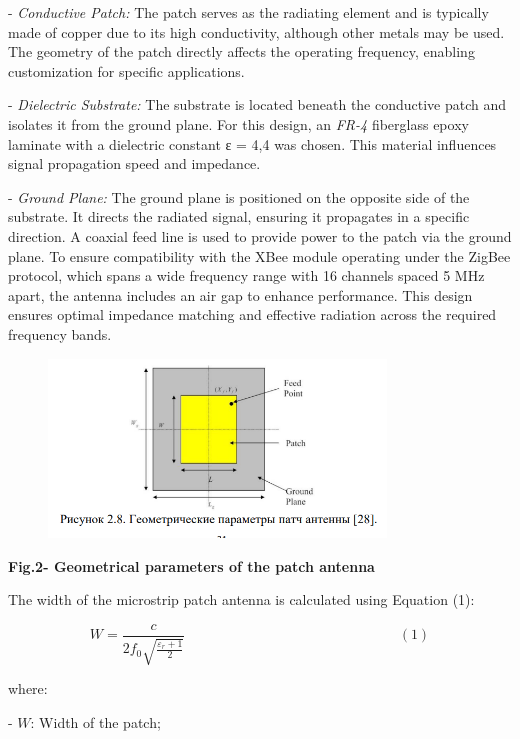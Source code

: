 - \emph{Conductive Patch:} The patch serves as the radiating element and
is typically made of copper due to its high conductivity, although
other metals may be used. The geometry of the patch directly affects
the operating frequency, enabling customization for specific
applications.

- \emph{Dielectric Substrate:} The substrate is located beneath the
conductive patch and isolates it from the ground plane. For this
design, an \emph{FR-4} fiberglass epoxy laminate with a dielectric
constant ε = 4,4 was chosen. This material influences signal
propagation speed and impedance.

- \emph{Ground Plane:} The ground plane is positioned on the opposite
side of the substrate. It directs the radiated signal, ensuring it
propagates in a specific direction. A coaxial feed line is used to
provide power to the patch via the ground plane.
To ensure compatibility with the XBee module operating under the ZigBee
protocol, which spans a wide frequency range with 16 channels spaced 5
MHz apart, the antenna includes an air gap to enhance performance. This
design ensures optimal impedance matching and effective radiation across
the required frequency bands.


\begin{figure}[H]
	\centering
	\includegraphics[width=0.8\textwidth]{media/ict/image42}
	\caption*{}
\end{figure}


{\bfseries Fig.2- Geometrical parameters of the patch antenna}

The width of the microstrip patch antenna is calculated using Equation
(1):

\[W = \frac{c}{2f_{0}\sqrt{\frac{\varepsilon_{r} + 1}{2}}}\ \ \ \ \ \ \ \ \ \ \ \ \ \ \ \ \ \ \ \ \ \ \ \ \ \ \ \ \ \ \ \ \ \ \ \ \ \ \ \ \ \ \ \ \ \ \ \ \ \ \ \ \ \ \ \ \ \ \ \ \ \ \ \ \ \ \ \ \ (1)\]

where:


- \(W\): Width of the patch;

